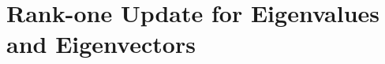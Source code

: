 \documentclass[12pt,Times]{article}
\def\cite{\citep}
\def\tcb{\textcolor{black}}
\def\D{{\mathbf{D}}}
\def\e{{\mathbf{e}}}
\def\X{{\mathbf{X}}}
\def\y{{\mathbf{y}}}
\def\Q{{\mathbf{Q}}}
\def\D{{\mathbf{D}}}
\def\I{{\mathbf{I}}}
\begin{document}

%



\newpage
\section{Rank-one Update for Eigenvalues and Eigenvectors}
\end{document}
